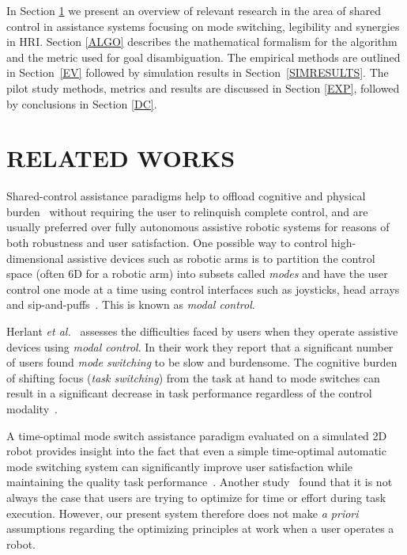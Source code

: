 \documentclass[conference]{IEEEtran}
\begin{document}
In Section \ref{RW} we present an overview of relevant research in the area of shared control in assistance systems focusing on mode switching, legibility and synergies in HRI. Section \ref{ALGO} describes the mathematical formalism for the algorithm and the metric used for goal disambiguation. The empirical methods are outlined in Section~\ref{EV} followed by simulation results in Section~\ref{SIMRESULTS}. The pilot study methods, metrics and results are discussed in Section \ref{EXP}, followed by conclusions in Section \ref{DC}.

\section{RELATED WORKS}\label{RW} 

Shared-control assistance paradigms help to offload cognitive and physical burden~\cite{volosyak2005rehabilitation} without requiring the user to relinquish complete control, and are usually preferred over fully autonomous assistive robotic systems for reasons of both robustness and user satisfaction. One possible way to control high-dimensional assistive devices such as robotic arms is to partition the control space (often 6D for a robotic arm) into subsets called \textit{modes} and have the user control one mode at a time using control interfaces such as joysticks, head arrays and sip-and-puffs~\cite{tsui2008development, nuttin2002selection}. This is known as \textit{modal control}.

Herlant \textit{et al.}~\cite{herlant2016assistive} assesses the difficulties faced by users when they operate assistive devices using \textit{modal control}. In their work they report that a significant number of users found \textit{mode switching} to be slow and burdensome. The cognitive burden of shifting focus (\textit{task switching})  from the task at hand to mode switches can result in a significant decrease in task performance regardless of the control modality~\cite{monsell2003task}. 

 A time-optimal mode switch assistance paradigm evaluated on a simulated 2D robot provides insight into the fact that even a simple time-optimal automatic mode switching system can significantly improve user satisfaction while maintaining the quality task performance~\cite{herlant2016assistive}.  Another study~\cite{gopinath2017human} found that it is not always the case that users are trying to optimize for time or effort during task execution. However, our present system therefore does not make \textit{a priori} assumptions regarding the optimizing principles at work when a user operates a robot.
\end{document}
